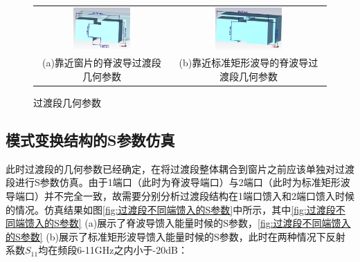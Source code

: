 \documentclass[master]{thesis-uestc}
\begin{document}
\begin{figure}[!htb]
    \small
    \centering
    \begin{tabular}{@{\ }c@{\ }c}
        \includegraphics[width=0.45\textwidth]{pic/chapter3/靠近窗片的脊波导过渡段.png} & 
        \hspace{5pt}
        \includegraphics[width=0.45\textwidth]{pic/chapter3/靠近标准矩形波导的脊波导过渡段.png}     \\
        \mbox{\small (a)靠近窗片的脊波导过渡段几何参数}                                                                               & 
        \mbox{\small (b)靠近标准矩形波导的脊波导过渡段几何参数}                                                                                  \\
    \end{tabular}
    \caption{过渡段几何参数}
    \label{fig:过渡段几何参数}
\end{figure}

\subsection{模式变换结构的S参数仿真}
此时过渡段的几何参数已经确定，在将过渡段整体耦合到窗片之前应该单独对过渡段进行S参数仿真。由于1端口（此时为脊波导端口）与2端口（此时为标准矩形波导端口）并不完全一致，故需要分别分析过渡段结构在1端口馈入和2端口馈入时候的情况。仿真结果如图\ref{fig:过渡段不同端馈入的S参数}中所示，其中\ref{fig:过渡段不同端馈入的S参数} (a)展示了脊波导馈入能量时候的S参数，\ref{fig:过渡段不同端馈入的S参数} (b)展示了标准矩形波导馈入能量时候的S参数，此时在两种情况下反射系数$S_{11}$均在频段6-11GHz之内小于-20dB：
\end{document}
